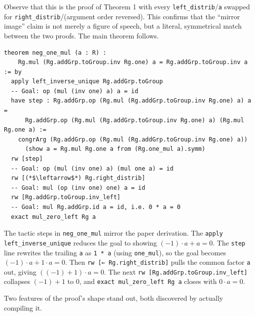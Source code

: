 Observe that this is the proof of Theorem 1 with every \texttt{left\_\allowbreak{}distrib}/\texttt{a} swapped for \texttt{right\_\allowbreak{}distrib}/(argument order reversed). This confirms that the ``mirror image'' claim is not merely a figure of speech, but a literal, symmetrical match between the two proofs. The main theorem follows.

\begin{lstlisting}
theorem neg_one_mul (a : R) :
    Rg.mul (Rg.addGrp.toGroup.inv Rg.one) a = Rg.addGrp.toGroup.inv a := by
  apply left_inverse_unique Rg.addGrp.toGroup
  -- Goal: op (mul (inv one) a) a = id
  have step : Rg.addGrp.op (Rg.mul (Rg.addGrp.toGroup.inv Rg.one) a) a =
      Rg.addGrp.op (Rg.mul (Rg.addGrp.toGroup.inv Rg.one) a) (Rg.mul Rg.one a) :=
    congrArg (Rg.addGrp.op (Rg.mul (Rg.addGrp.toGroup.inv Rg.one) a))
      (show a = Rg.mul Rg.one a from (Rg.one_mul a).symm)
  rw [step]
  -- Goal: op (mul (inv one) a) (mul one a) = id
  rw [(*$\leftarrow$*) Rg.right_distrib]
  -- Goal: mul (op (inv one) one) a = id
  rw [Rg.addGrp.toGroup.inv_left]
  -- Goal: mul Rg.addGrp.id a = id, i.e. 0 * a = 0
  exact mul_zero_left Rg a
\end{lstlisting}

The tactic steps in \texttt{neg\_\allowbreak{}one\_\allowbreak{}mul} mirror the paper derivation. The \texttt{apply left\_\allowbreak{}inverse\_\allowbreak{}unique} reduces the goal to showing \((-1)\cdot a + a = 0\). The \texttt{step} line rewrites the trailing \texttt{a} as \texttt{1 * a} (using \texttt{one\_\allowbreak{}mul}), so the goal becomes \((-1)\cdot a + 1\cdot a = 0\). Then \texttt{rw [← Rg.right\_\allowbreak{}distrib]} pulls the common factor \texttt{a} out, giving \(((-1)+1)\cdot a = 0\). The next \texttt{rw [Rg.addGrp.toGroup.inv\_\allowbreak{}left]} collapses \((-1)+1\) to \(0\), and \texttt{exact mul\_\allowbreak{}zero\_\allowbreak{}left Rg a} closes with \(0 \cdot a = 0\).

Two features of the proof's shape stand out, both discovered by actually compiling it.

